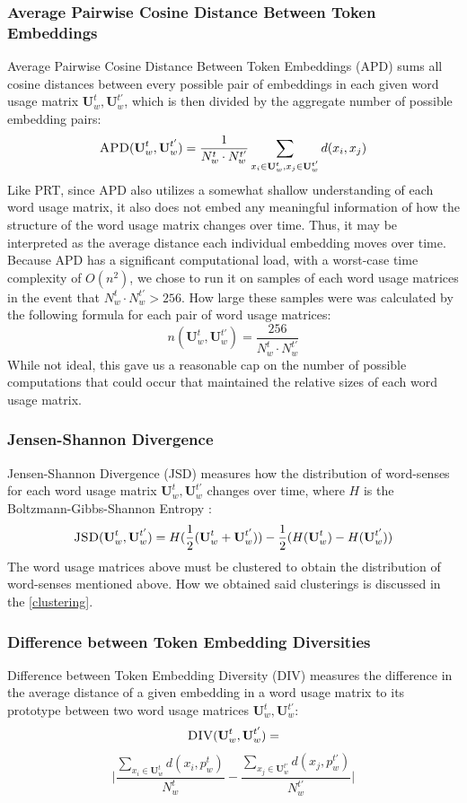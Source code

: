 \documentclass[10pt, a4paper]{article}
\begin{document}
\subsubsection{Average Pairwise Cosine Distance Between Token Embeddings}
Average Pairwise Cosine Distance Between Token Embeddings (APD) sums all cosine distances between every possible pair of embeddings in each given word usage matrix $\textbf{U}^{t}_w, \textbf{U}^{t'}_w$, which is then divided by the aggregate number of possible embedding pairs:
$$\textsc{APD}(\textbf{U}^{t}_w, \textbf{U}^{t'}_w) = \frac{1}{N^{t}_w \cdot N^{t'}_w} \sum_{x_i \in \textbf{U}^{t}_w, x_j \in \textbf{U}^{t'}_w} d(x_i, x_j)$$
Like PRT, since APD also utilizes a somewhat shallow understanding of each word usage matrix, it also does not embed any meaningful information of how the structure of the word usage matrix changes over time. Thus, it may be interpreted as the average distance each individual embedding moves over time.\\

Because APD has a significant computational load, with a worst-case time complexity of $O(n^2)$, we chose to run it on samples of each word usage matrices in the event that $N^{t}_w \cdot N^{t'}_w > 256$. How large these samples were was calculated by the following formula for each pair of word usage matrices:
$$n(\textbf{U}^{t}_w, \textbf{U}^{t'}_w) = \frac{256}{N^{t}_w \cdot N^{t'}_w}$$
While not ideal, this gave us a reasonable cap on the number of possible computations that could occur that maintained the relative sizes of each word usage matrix. %

\subsubsection{Jensen-Shannon Divergence}
\label{JSD}
Jensen-Shannon Divergence (JSD) measures how the distribution of word-senses for each word usage matrix $\textbf{U}^{t}_w, \textbf{U}^{t'}_w$ changes over time, where $H$ is the Boltzmann-Gibbs-Shannon Entropy \cite{jensenshannon}:
\small $$\textsc{JSD}(\textbf{U}^{t}_w, \textbf{U}^{t'}_w) = H(\frac{1}{2}(\textbf{U}^{t}_w + \textbf{U}^{t'}_w)) - \frac{1}{2}(H(\textbf{U}^{t}_w) - H(\textbf{U}^{t'}_w))$$
The word usage matrices above must be clustered to obtain the distribution of word-senses mentioned above. How we obtained said clusterings is discussed in the \ref{clustering}.
\subsubsection{Difference between Token Embedding Diversities}
Difference between Token Embedding Diversity (DIV) measures the difference in the average distance of a given embedding in a word usage matrix to its prototype between two word usage matrices $\textbf{U}^{t}_w, \textbf{U}^{t'}_w$:
$$\textsc{DIV}(\textbf{U}^{t}_w, \textbf{U}^{t'}_w) = $$ 
$$\Bigg | \frac{\sum_{x_i \in \textbf{U}^{t}_w} d(x_i, p^{t}_w)}{N^{t}_w} - \frac{\sum_{x_j \in \textbf{U}^{t'}_w} d(x_j, p^{t'}_w)}{N^{t'}_w} \Bigg |$$
\end{document}
